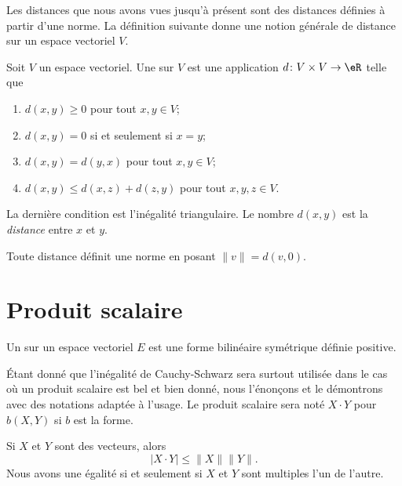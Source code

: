 Les distances que nous avons vues jusqu'à présent sont des distances définies à partir d'une norme. La définition suivante donne une notion générale de distance sur un espace vectoriel \( V\).

\begin{definition}
    Soit \( V\) un espace vectoriel. Une  sur \( V\) est une application \( d\colon V\times V\to \eR\) telle que
    \begin{enumerate}
        \item
            \( d(x,y)\geq 0\) pour tout \( x,y\in V\);
        \item
            \( d(x,y)=0\) si et seulement si \( x=y\);
        \item
            \( d(x,y)=d(y,x)\) pour tout \( x,y\in V\);
        \item
            \( d(x,y)\leq d(x,z)+d(z,y)\) pour tout \( x,y,z\in V\).
    \end{enumerate}
    La dernière condition est l'inégalité triangulaire. Le nombre \( d(x,y)\) est la \emph{distance} entre \( x\) et \( y\).
\end{definition}
Toute distance définit une norme en posant \( \| v \|=d(v,0)\).

\section{Produit scalaire}

\begin{definition}\label{DefVJIeTFj}
    Un  sur un espace vectoriel \( E\) est une forme bilinéaire symétrique définie positive.
\end{definition}

Étant donné que l'inégalité de Cauchy-Schwarz sera surtout utilisée dans le cas où un produit scalaire est bel et bien donné, nous l'énonçons et le démontrons avec des notations adaptée à l'usage. Le produit scalaire sera noté \( X\cdot Y\) pour \( b(X,Y)\) si \( b\) est la forme.
\begin{theorem}      \label{ThoAYfEHG}
	Si $X$ et $Y$ sont des vecteurs, alors
	\begin{equation}
		| X\cdot Y |\leq\| X \|\| Y \|.
	\end{equation}
    Nous avons une égalité si et seulement si \( X\) et \( Y\) sont multiples l'un de l'autre.
\end{theorem}

